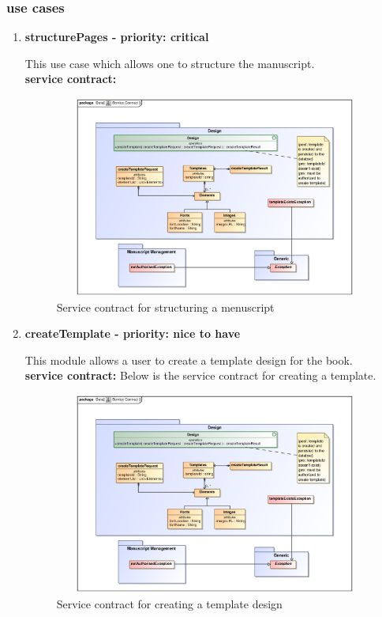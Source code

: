 \documentclass[12pt]{article}
\begin{document}
\subsubsection{use cases}
\begin{enumerate}
\item \textbf{structurePages - priority: critical}\\
\par{This use case which allows one to structure the  manuscript.}\\
\textbf{service contract:}

 \begin{figure}[h]
\includegraphics[height=250px, width=500px]{epsImages/Design/createTemplateServiceContract.eps}
\caption{Service contract for structuring a menuscript}
\end{figure}

\item \textbf{createTemplate - priority: nice to have}\\
\par{This module allows a user to create a template design for the book.}\\
\textbf{service contract:} Below is the service contract for creating a template.

 \begin{figure}[h]
\includegraphics[height=250px, width=500px]{epsImages/Design/createTemplateServiceContract.eps}
\caption{Service contract for creating a template design}
\end{figure}


\end{enumerate}
\end{document}
